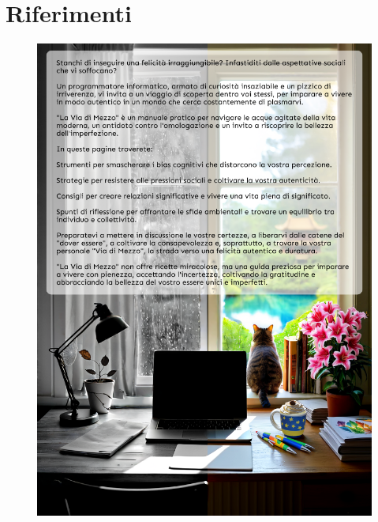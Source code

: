 \documentclass[12pt]{book} %
\begin{document}
\clearpage\section{Riferimenti}
\theendnotes

\clearpage
{}

\begin{figure}[htbp]
    \centering
    \includegraphics[width=\paperwidth,height=\paperheight]{images/cover_back.png}
    \vspace{-\baselineskip} %
\end{figure}
\end{document}
